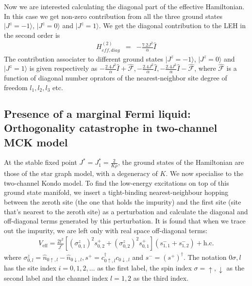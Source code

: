 \documentclass[reprint,prb,superscriptaddress]{revtex4-2}
\begin{document}
 
\noindent Now we are interested calculating the diagonal part of the effective Hamiltonian. In this case we get non-zero contribution from all the three ground states $|J^z=-1\rangle$, $|J^z=0\rangle$ and $|J^z=1\rangle$.
We get the diagonal contribution to the LEH in the second order is 
\begin{eqnarray}
H^{(2)}_{eff, diag} &=& - \frac{7.2 J^2}{\alpha} \hat{I}
\end{eqnarray}
The contribution associater to different ground states $|J^z=-1\rangle$, $|J^z=0\rangle$ and $|J^z=1\rangle$ is given respectively as $- \frac{2.4 J^2}{\alpha} \hat{I} + \hat{\mathcal{F}},- \frac{2.4 J^2}{\alpha} \hat{I} ,- \frac{2.4 J^2}{\alpha} \hat{I} - \hat{\mathcal{F} }$,
\noindent where $\hat{\mathcal{F}}$ is a function of diagonal number oprators of the nearest-neighbor site degree of freedom $l_1,l_2,l_3$ etc.

\subsection{Presence of a marginal Fermi liquid: Orthogonality catastrophe in two-channel MCK model}
At the stable fixed point \(J ^* = J_1^* = \frac{2}{K \rho}\), the ground states of the Hamiltonian are those of the star graph model, with a degeneracy of \(K\). We now specialise to the two-channel Kondo model. To find the low-energy excitations on top of this ground state manifold, we insert a tight-binding nearest-neighbour hopping between the zeroth site (the one that holds the impurity) and the first site (site that's nearest to the zeroth site) as a perturbation and calculate the diagonal and off-diagonal terms generated by this perturbation. It is found that when we trace out the impurity, we are left only with real space off-diagonal terms:
\begin{equation}\begin{aligned}
	\label{nfl_terms}
	V_\text{eff} = \frac{2t^2}{J^*}\left[\left(\sigma^z_{0,1}\right)^2 s^+_{0,2} + \left(\sigma^z_{0,2}\right)^2 s^+_{0,1}\right] \left(s^-_{1,1} + s^-_{1,2}\right) + \text{h.c.}
\end{aligned}\end{equation}
where \(\sigma^z_{0,l} = \hat n_{0\uparrow,l} - \hat n_{0\downarrow,l}, s^+ = c^\dagger_{0 \uparrow,l}c_{0 \downarrow,l}\) and \(s^- = \left(s^+\right)^\dagger\). The notation \(0\sigma,l\) has the site index \(i=0,1,2,\ldots\) as the first label, the spin index \(\sigma=\uparrow,\downarrow\) as the second label and the channel index \(l=1,2\) as the third index.
\end{document}
